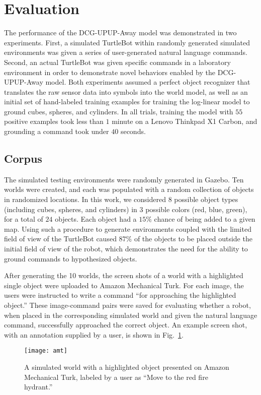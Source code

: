 \section{Evaluation}
\label{sec:evaluation}
The performance of the DCG-UPUP-Away model was demonstrated in two experiments.
First, a simulated TurtleBot within randomly generated simulated environments was given a series of user-generated natural language commands.
Second, an actual TurtleBot was given specific commands in a laboratory environment in order to demonstrate novel behaviors enabled by the DCG-UPUP-Away model.
Both experiments assumed a perfect object recognizer that translates the raw sensor data into symbols into the world model, as well as an initial set of hand-labeled training examples for training the log-linear model to ground cubes, spheres, and cylinders.
In all trials, training the model with $55$ positive examples took less than $1$ minute on a Lenovo Thinkpad X1 Carbon, and grounding a command took under $40$ seconds.

\subsection{Corpus}
The simulated testing environments were randomly generated in Gazebo.
Ten worlds were created, and each was populated with a random collection of objects in randomized locations.
In this work, we considered $8$ possible object types (including cubes, spheres, and cylinders) in $3$ possible colors (red, blue, green), for a total of $24$ objects.
Each object had a $15\%$ chance of being added to a given map.
Using such a procedure to generate environments coupled with the limited field of view of the TurtleBot caused $87\%$ of the objects to be placed outside the initial field of view of the robot, which demonstrates the need for the ability to ground commands to hypothesized objects.

After generating the 10 worlds, the screen shots of a world with a highlighted single object were uploaded to Amazon Mechanical Turk. For each image, the users were instructed to write a command ``for approaching the highlighted object.''
These image-command pairs were saved for evaluating whether a robot, when placed in the corresponding simulated world and given the natural language command, successfully approached the correct object.
An example screen shot, with an annotation supplied by a user, is shown in Fig.~\ref{fig:amt}.
\begin{figure}[b!]
	\centering
    \texttt{[image: amt]}
	\caption{A simulated world with a highlighted object presented on Amazon Mechanical Turk, labeled by a user as ``Move to the red fire hydrant.''}
	\label{fig:amt}
\end{figure}
